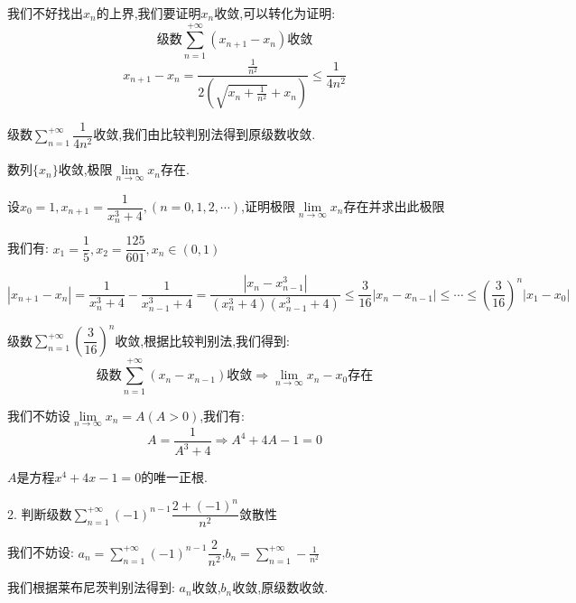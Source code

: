 \begin{solution}
\begin{solution}
		我们不好找出$x_{n}$的上界,我们要证明$x_{n}$收敛,可以转化为证明: 
		$$\text{级数}\sum\limits_{n=1}^{+\infty}(x_{n+1}-x_{n})\text{收敛}$$
		$$x_{n+1}-x_{n}=\dfrac{\frac{1}{n^2}}{2(\sqrt{x_{n}+\frac{1}{n^2}}+x_{n})}\leq \frac{1}{4n^2}$$
		
		级数$\sum\limits_{n=1}^{+\infty}\dfrac{1}{4n^2}$收敛,我们由比较判别法得到原级数收敛.
		
		数列$\{x_{n}\}$收敛,极限$\lim\limits_{n\rightarrow\infty}x_{n}$存在.
	\end{solution}
	\begin{proposition}
		设$x_{0}=1,x_{n+1}=\dfrac{1}{x_{n}^3+4},(n=0,1,2,\cdots)$,证明极限$\lim\limits_{n\rightarrow\infty}x_{n}$存在并求出此极限
	\end{proposition}
	\begin{solution}
		
		我们有: $x_{1}=\dfrac{1}{5},x_{2}=\dfrac{125}{601},x_{n}\in(0,1)$
		
		$$|x_{n+1}-x_{n}|=\dfrac{1}{x_{n}^3+4}-\dfrac{1}{x_{n-1}^3+4}=\dfrac{|x_{n}-x_{n-1}^3|}{(x_{n}^3+4)(x_{n-1}^3+4)}\leq \dfrac{3}{16}|x_{n}-x_{n-1}|\leq \cdots\leq (\dfrac{3}{16})^{n}|x_{1}-x_{0}|$$
		
		级数$\sum\limits_{n=1}^{+\infty}(\dfrac{3}{16})^{n}$收敛,根据比较判别法,我们得到: 
		$$\text{级数}\sum\limits_{n=1}^{+\infty}(x_{n}-x_{n-1})\text{收敛}\Rightarrow \lim\limits_{n\rightarrow\infty}x_{n}-x_{0}\text{存在}$$
		
		我们不妨设$\lim\limits_{n\rightarrow\infty}x_{n}=A(A>0)$,我们有: 
		$$A=\dfrac{1}{A^3+4}\Rightarrow A^4+4A-1=0$$
		
		$A$是方程$x^4+4x-1=0$的唯一正根.
	\end{solution}
	
\end{solution}


2. 判断级数$\sum\limits_{n=1}^{+\infty}(-1)^{n-1}\dfrac{2+(-1)^n}{n^2}$敛散性
\begin{solution}
	
	我们不妨设: $a_{n}=\sum\limits_{n=1}^{+\infty}(-1)^{n-1}\dfrac{2}{n^2}$,$b_{n}=\sum\limits_{n=1}^{+\infty}-\frac{1}{n^2}$
	
	我们根据莱布尼茨判别法得到: 
	$a_{n}$收敛,$b_{n}$收敛,原级数收敛.
\end{solution}


